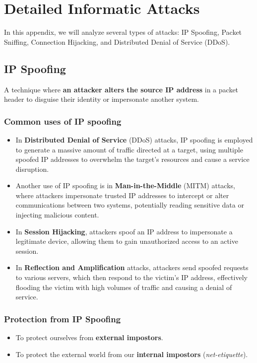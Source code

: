\chapter{Detailed Informatic Attacks}

In this appendix, we will analyze several types of attacks: IP Spoofing, Packet Sniffing, Connection Hijacking, and Distributed Denial of Service (DDoS).

\raggedright
\begin{center}
    \section{IP Spoofing} 
\end{center}
A technique where \textbf{an attacker alters the source IP address} in a packet header to disguise their identity or impersonate another system.

\subsection*{Common uses of IP spoofing}
\begin{itemize}
    \item In \textbf{Distributed Denial of Service} (DDoS) attacks, IP spoofing is employed to generate a massive amount of traffic directed at a target, using multiple spoofed IP addresses to overwhelm the target’s resources and cause a service disruption.

    \item Another use of IP spoofing is in \textbf{Man-in-the-Middle} (MITM) attacks, where attackers impersonate trusted IP addresses to intercept or alter communications between two systems, potentially reading sensitive data or injecting malicious content.

    \item In \textbf{Session Hijacking}, attackers spoof an IP address to impersonate a legitimate device, allowing them to gain unauthorized access to an active session.

    \item In \textbf{Reflection and Amplification} attacks, attackers send spoofed requests to various servers, which then respond to the victim’s IP address, effectively flooding the victim with high volumes of traffic and causing a denial of service.
\end{itemize}

\subsection*{Protection from IP Spoofing}
\begin{itemize}
    \item To protect ourselves from \textbf{external impostors}.
    \item To protect the external world from our \textbf{internal impostors} (\textit{net-etiquette}).
\end{itemize}


